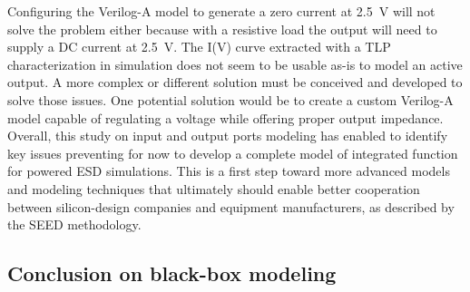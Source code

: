 Configuring the Verilog-A model to generate a zero current at \SI{2.5}{\volt} will not solve the problem either because with a resistive load the output will need to supply a DC current at \SI{2.5}{\volt}.
The I(V) curve extracted with a TLP characterization in simulation does not seem to be usable as-is to model an active output.
A more complex or different solution must be conceived and developed to solve those issues.
One potential solution would be to create a custom Verilog-A model capable of regulating a voltage while offering proper output impedance.
Overall, this study on input and output ports modeling has enabled to identify key issues preventing for now to develop a complete model of integrated function for powered ESD simulations.
This is a first step toward more advanced models and modeling techniques that ultimately should enable better cooperation between silicon-design companies and equipment manufacturers, as described by the SEED methodology.

\subsection{Conclusion on black-box modeling}


